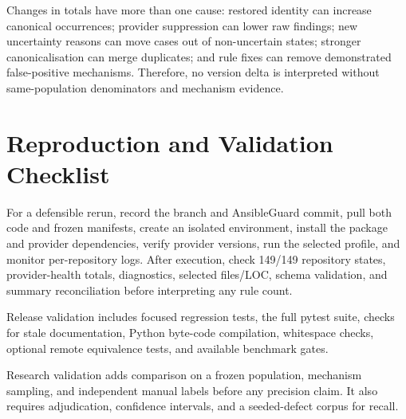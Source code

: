 Changes in totals have more than one cause: restored identity can increase
canonical occurrences; provider suppression can lower raw findings; new
uncertainty reasons can move cases out of non-uncertain states; stronger
canonicalisation can merge duplicates; and rule fixes can remove demonstrated
false-positive mechanisms. Therefore, no version delta is interpreted without
same-population denominators and mechanism evidence.

\section{Reproduction and Validation Checklist}
For a defensible rerun, record the branch and AnsibleGuard commit, pull both
code and frozen manifests, create an isolated environment, install the package
and provider dependencies, verify provider versions, run the selected profile,
and monitor per-repository logs. After execution, check 149/149 repository
states, provider-health totals, diagnostics, selected files/LOC, schema
validation, and summary reconciliation before interpreting any rule count.

Release validation includes focused regression tests, the full pytest suite,
checks for stale documentation, Python byte-code compilation, whitespace checks,
optional remote equivalence tests, and available benchmark gates.

Research validation adds comparison on a frozen population, mechanism sampling,
and independent manual labels before any precision claim. It also requires
adjudication, confidence intervals, and a seeded-defect corpus for recall.

